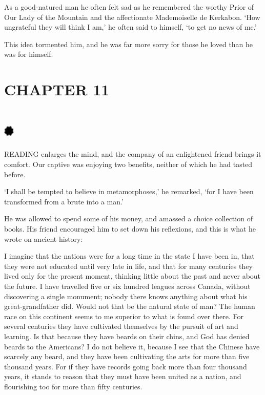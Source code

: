 \documentclass{article}
\begin{document}
\begin{center}
As a good-natured man he often felt sad as he remembered the worthy Prior of Our 
Lady of the Mountain and the affectionate Mademoiselle de Kerkabon. `How ungrateful 
they will think I am,' he often said to himself, `to get no news of me.' 

This idea tormented him, and he was far more sorry for those he loved than he was 
for himself.\pagebreak{} 

\section*{\textbf{CHAPTER 11 }}

\section*{%
\includegraphics[width=14pt, height=15pt, keepaspectratio=true]{Zadig or L'Ingenu - Voltaire-fig033.jpg}
}

 

READING enlarges the mind, and the company of an enlightened friend brings it comfort. 
Our captive was enjoying two benefits, neither of which he had tasted before. 

`I shall be tempted to believe in metamorphoses,' he remarked, `for I have been 
transformed from a brute into a man.' 

He was allowed to spend some of his money, and amassed a choice collection of books. 
His friend encouraged him to set down his reflexions, and this is what he wrote 
on ancient history: 

I imagine that the nations were for a long time in the state I have been in, that 
they were not educated until very late in life, and that for many centuries they 
lived only for the present moment, thinking little about the past and never about 
the future. I have travelled five or six hundred leagues across Canada, without 
discovering a single monument; nobody there knows anything about what his great-grandfather 
did. Would not that be the natural state of man? The human race on this continent 
seems to me superior to what is found over there. For several centuries they have 
cultivated themselves by the pursuit of art and learning. Is that because they 
have beards on their chins, and God has denied beards to the Americans? I do not 
believe it, because I see that the Chinese have scarcely any beard, and they have 
been cultivating the arts for more than five thousand years. For if they have records 
going back more than four thousand years, it stands to reason that they must have 
been united as a nation, and flourishing too for more than fifty centuries. 


\end{center}
\end{document}

